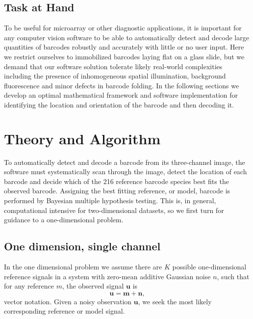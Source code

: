 \subsection{Task at Hand}
To be useful for microarray or other diagnostic applications, it is important for any computer vision software to be able to automatically detect and decode large quantities of barcodes robustly and accurately with little or no user input. 
Here we restrict ourselves to immobilized barcodes laying flat on a glass slide, but we demand that our software solution tolerate likely real-world complexities including the presence of inhomogeneous spatial illumination, background fluorescence and minor defects in barcode folding.  
In the following sections we develop an optimal mathematical framework and software implementation for identifying the location and orientation of the barcode and then decoding it.


\section{Theory and Algorithm}
To automatically detect and decode a barcode from its three-channel image, the software must systematically scan through the image, detect the location of each barcode and decide which of the 216 reference barcode species best fits the observed barcode. Assigning the best fitting reference, or model, barcode is performed by Bayesian multiple hypothesis testing. This is, in general, computational intensive for two-dimensional datasets, so we first turn for guidance to a one-dimensional problem.


\subsection{One dimension, single channel}
In the one dimensional problem we assume there are $K$ possible one-dimensional reference signals in a system with zero-mean additive Gaussian noise $n$, such that for any reference $m$, the observed signal $\mathbf{u}$ is
\begin{equation}
\mathbf{u}=\mathbf{m} + \mathbf{n},
\end{equation}
vector notation. Given a noisy observation $\mathbf{u}$, we seek the most likely corresponding reference or model signal. 



